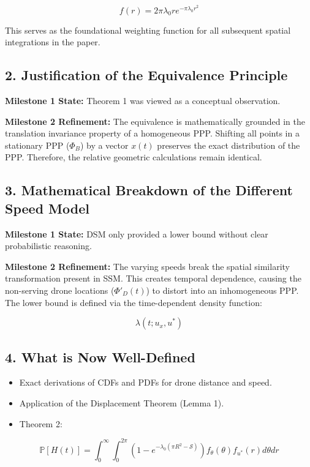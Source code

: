 \documentclass[12pt,a4paper]{article}
\begin{document}
\[
f(r) = 2\pi\lambda_0 r e^{-\pi\lambda_0 r^2}
\]

This serves as the foundational weighting function for all subsequent spatial integrations in the paper.

\subsection{2. Justification of the Equivalence Principle}

\textbf{Milestone 1 State:} Theorem 1 was viewed as a conceptual observation.

\textbf{Milestone 2 Refinement:} The equivalence is mathematically grounded in the translation invariance property of a homogeneous PPP. Shifting all points in a stationary PPP ($\Phi_B$) by a vector $x(t)$ preserves the exact distribution of the PPP. Therefore, the relative geometric calculations remain identical.

\subsection{3. Mathematical Breakdown of the Different Speed Model}

\textbf{Milestone 1 State:} DSM only provided a lower bound without clear probabilistic reasoning.

\textbf{Milestone 2 Refinement:} The varying speeds break the spatial similarity transformation present in SSM. This creates temporal dependence, causing the non-serving drone locations ($\Phi'_D(t)$) to distort into an inhomogeneous PPP. The lower bound is defined via the time-dependent density function:

\[
\lambda(t; u_x, u^*)
\]

\subsection{4. What is Now Well-Defined}

\begin{itemize}
    \item Exact derivations of CDFs and PDFs for drone distance and speed.
    \item Application of the Displacement Theorem (Lemma 1).
    \item Theorem 2:
\end{itemize}

\[
\mathbb{P}[H(t)] = \int_{0}^{\infty} \int_{0}^{2\pi}
\left( 1 - e^{-\lambda_0(\pi R^2 - \mathcal{S})} \right)
f_{\theta}(\theta)
f_{u^*}(r)
d\theta dr
\]
\end{document}
